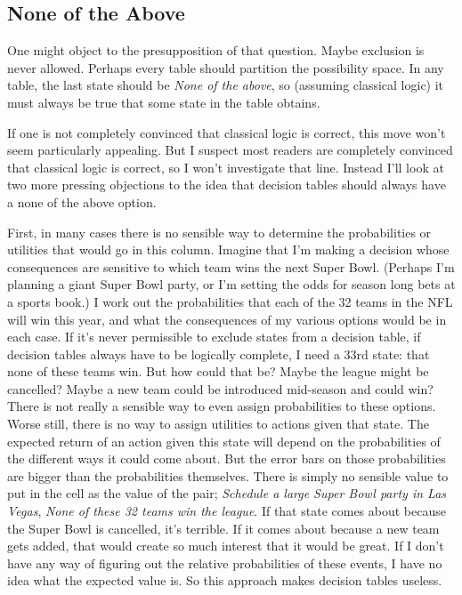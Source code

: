 \documentclass[
  12pt,
  letterpaper,
]{scrbook}
\begin{document}
\subsection{None of the Above}\label{sec-none-of-the-above}

One might object to the presupposition of that question. Maybe exclusion
is never allowed. Perhaps every table should partition the possibility
space. In any table, the last state should be \emph{None of the above},
so (assuming classical logic) it must always be true that some state in
the table obtains.

If one is not completely convinced that classical logic is correct, this
move won't seem particularly appealing. But I suspect most readers are
completely convinced that classical logic is correct, so I won't
investigate that line. Instead I'll look at two more pressing objections
to the idea that decision tables should always have a none of the above
option.

First, in many cases there is no sensible way to determine the
probabilities or utilities that would go in this column. Imagine that
I'm making a decision whose consequences are sensitive to which team
wins the next Super Bowl. (Perhaps I'm planning a giant Super Bowl
party, or I'm setting the odds for season long bets at a sports book.) I
work out the probabilities that each of the 32 teams in the NFL will win
this year, and what the consequences of my various options would be in
each case. If it's never permissible to exclude states from a decision
table, if decision tables always have to be logically complete, I need a
33rd state: that none of these teams win. But how could that be? Maybe
the league might be cancelled? Maybe a new team could be introduced
mid-season and could win? There is not really a sensible way to even
assign probabilities to these options. Worse still, there is no way to
assign utilities to actions given that state. The expected return of an
action given this state will depend on the probabilities of the
different ways it could come about. But the error bars on those
probabilities are bigger than the probabilities themselves. There is
simply no sensible value to put in the cell as the value of the pair;
\emph{Schedule a large Super Bowl party in Las Vegas}, \emph{None of
these 32 teams win the league}. If that state comes about because the
Super Bowl is cancelled, it's terrible. If it comes about because a new
team gets added, that would create so much interest that it would be
great. If I don't have any way of figuring out the relative
probabilities of these events, I have no idea what the expected value
is. So this approach makes decision tables useless.
\end{document}
